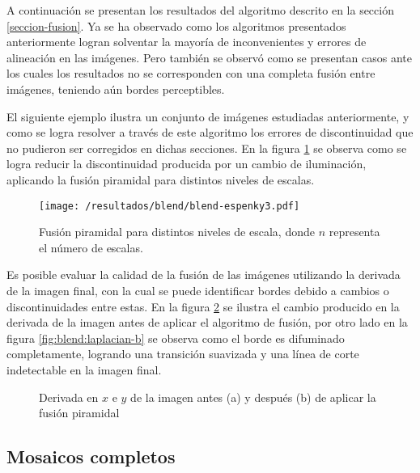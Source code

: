 A continuación se presentan los resultados del algoritmo descrito en la sección \ref{seccion-fusion}. Ya se ha observado como los algoritmos presentados anteriormente logran solventar la mayoría de inconvenientes y errores de alineación en las imágenes. Pero también se observó como se presentan casos ante los cuales los resultados no se corresponden con una completa fusión entre imágenes, teniendo aún bordes perceptibles.

El siguiente ejemplo ilustra un conjunto de imágenes estudiadas anteriormente, y como se logra resolver a través de este algoritmo los errores de discontinuidad que no pudieron ser corregidos en dichas secciones. En la figura \ref{imagen:blend:espenky} se observa como se logra reducir la discontinuidad producida por un cambio de iluminación, aplicando la fusión piramidal para distintos niveles de escalas.

\begin{figure}[h]
	\centering
	\texttt{[image: /resultados/blend/blend-espenky3.pdf]}
	\caption[Resultado de fusión pirámidal: \textit{Espenky}]{Fusión piramidal para distintos niveles de escala, donde $n$ representa el número de escalas.}
	\label{imagen:blend:espenky}
\end{figure}

Es posible evaluar la calidad de la fusión de las imágenes utilizando la derivada de la imagen final, con la cual se puede identificar bordes debido a cambios o discontinuidades entre estas. En la figura \ref{imagen:blend:laplacian} se ilustra el cambio producido en la derivada de la imagen antes de aplicar el algoritmo de fusión, por otro lado en la figura \ref{fig:blend:laplacian-b} se observa como el borde es difuminado completamente, logrando una transición suavizada y una línea de corte indetectable en la imagen final. 

\begin{figure}[H]
	\centering     %
	
	\caption[Resultado de fusión pirámidal: \textit{Espenky}]{Derivada en $x$ e $y$ de la imagen antes (a) y después (b) de aplicar la fusión piramidal}
	\label{imagen:blend:laplacian}
\end{figure}

\subsection*{Mosaicos completos}

